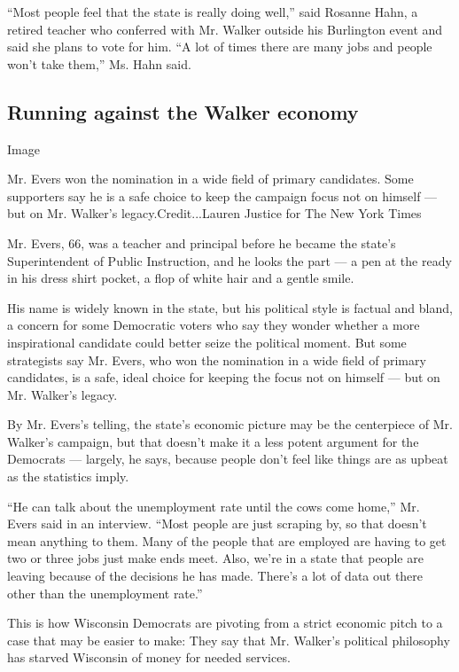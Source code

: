 ``Most people feel that the state is really doing well,'' said Rosanne
Hahn, a retired teacher who conferred with Mr. Walker outside his
Burlington event and said she plans to vote for him. ``A lot of times
there are many jobs and people won't take them,'' Ms. Hahn said.

\hypertarget{running-against-the-walker-economy}{%
\subsection{Running against the Walker
economy}\label{running-against-the-walker-economy}}

Image

Mr. Evers won the nomination in a wide field of primary candidates. Some
supporters say he is a safe choice to keep the campaign focus not on
himself --- but on Mr. Walker's legacy.Credit...Lauren Justice for The
New York Times

Mr. Evers, 66, was a teacher and principal before he became the state's
Superintendent of Public Instruction, and he looks the part --- a pen at
the ready in his dress shirt pocket, a flop of white hair and a gentle
smile.

His name is widely known in the state, but his political style is
factual and bland, a concern for some Democratic voters who say they
wonder whether a more inspirational candidate could better seize the
political moment. But some strategists say Mr. Evers, who won the
nomination in a wide field of primary candidates, is a safe, ideal
choice for keeping the focus not on himself --- but on Mr. Walker's
legacy.

By Mr. Evers's telling, the state's economic picture may be the
centerpiece of Mr. Walker's campaign, but that doesn't make it a less
potent argument for the Democrats --- largely, he says, because people
don't feel like things are as upbeat as the statistics imply.

``He can talk about the unemployment rate until the cows come home,''
Mr. Evers said in an interview. ``Most people are just scraping by, so
that doesn't mean anything to them. Many of the people that are employed
are having to get two or three jobs just make ends meet. Also, we're in
a state that people are leaving because of the decisions he has made.
There's a lot of data out there other than the unemployment rate.''

This is how Wisconsin Democrats are pivoting from a strict economic
pitch to a case that may be easier to make: They say that Mr. Walker's
political philosophy has starved Wisconsin of money for needed services.

